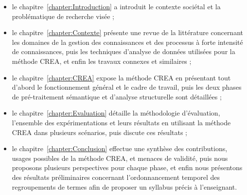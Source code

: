 \begin{itemize}
\item le chapitre~\ref{chapter:Introduction} a introduit le contexte sociétal et la problématique de recherche visée ;

\item le chapitre~\ref{chapter:Contexte} présente une revue de la littérature concernant les domaines de la gestion des connaissances et des processus à forte intensité de connaissances, puis les techniques d'analyse de données utilisées pour la méthode CREA, et enfin les travaux connexes et similaires ;

\item le chapitre~\ref{chapter:CREA} expose la méthode CREA en présentant tout d'abord le fonctionnement général et le cadre de travail, puis les deux phases de pré-traitement sémantique et d'analyse structurelle sont détaillées ;

\item le chapitre~\ref{chapter:Evaluation} détaille la méthodologie d'évaluation, l'ensemble des expérimentations et leurs résultats en utilisant la méthode CREA dans plusieurs scénarios, puis discute ces résultats ;

\item le chapitre~\ref{chapter:Conclusion} effectue une synthèse des contributions, usages possibles de la méthode CREA, et menaces de validité, puis nous proposons plusieurs perspectives pour chaque phase, et enfin nous présentons des résultats préliminaires concernant l'ordonnancement temporel des regroupements de termes afin de proposer un syllabus précis à l'enseignant.
\end{itemize}
